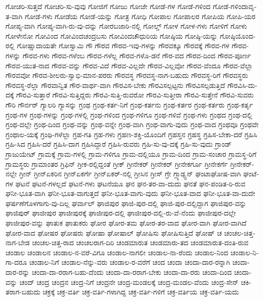 {ಗೋಚರಿ-ಸುತ್ತದೆ
ಗೋಚರಿ-ಸು-ವುವು
ಗೋಜಿಗೆ
ಗೋಜು
ಗೋಜೇ
ಗೋಡೆ-ಗಳ
ಗೋಡೆ-ಗಳಿಂದ
ಗೋಡೆ-ಗಳಿಂದಾವೃ-ತ-ವಾಗಿ
ಗೋಡೆ-ಗಳು
ಗೋಡೆಯ
ಗೋಡೆ-ಯನ್ನು
ಗೋತ್ರ
ಗೋಧಿ
ಗೋಪಾಲ
ಗೋಪಾಲರ
ಗೋಪಿಯ
ಗೋಪಿ-ಯರ
ಗೋಪ್ಯ-ವಾಗಿ
ಗೋಪ್ಯ-ವಾಗಿ-ರು-ವು-ದನ್ನು
ಗೋರಬಜಾರಿ-ನಲ್ಲಿ
ಗೋಲ್ಡ್
ಗೋಳ
ಗೋಳ-ಗಳು
ಗೋಳಿಗೆ
ಗೋಳು
ಗೋಳೇನೋ
ಗೋವಿಂದ
ಗೋವಿಂದಚಂದ್ರಬಸು
ಗೋವಿಂದಚೌಧುರಿಯ
ಗೋಷ್ಠಿಯ
ಗೋಷ್ಠಿ-ಯನ್ನು
ಗೋಷ್ಠಿಯೊಂದ-ರಲ್ಲಿ
ಗೋಷ್ಷಾದಾಯತೇ
ಗೋಸ್ವಾಮಿ
ಗೌ
ಗೌರವ
ಗೌರವ-ಇವು-ಗಳನ್ನು
ಗೌರವಕ್ಕೂ
ಗೌರವಕ್ಕೆ
ಗೌರವ-ಗಳ
ಗೌರವ-ಗಳನ್ನು
ಗೌರವ-ಗಳು
ಗೌರವ-ಗಳೆಂಬ
ಗೌರವ-ಗಳೆಲ್ಲ
ಗೌರವ-ಗಳೊ-ಡನೆ
ಗೌರ-ವದ
ಗೌರವ-ದಿಂದ
ಗೌರವ-ಪೂರ್ಣ
ಗೌರವ-ಯುತ-ನಾದ
ಗೌರವ-ವನ್ನು
ಗೌರವ-ವಿದೆ
ಗೌರವ-ವಿಲ್ಲದೇ
ಗೌರವ-ವಿಲ್ಲವೋ
ಗೌರವ-ವೆಂದೂ
ಗೌರವ-ವೆಲ್ಲಾ
ಗೌರವವೋ
ಗೌರವ-ಶೀಲರು-ಸ್ವಾಭಿ-ಮಾನ-ಪರರು
ಗೌರವಸ್ಥ
ಗೌರವಸ್ಥ-ನಾಗ-ಬಹುದು
ಗೌರವಸ್ಥ-ರಿಗೆ
ಗೌರವಸ್ಥರು
ಗೌರವಸ್ಥ-ರೆಲ್ಲಾ
ಗೌರವಾನ್ವಿತ
ಗೌರ-ವಾರ್ಥ-ವಾಗಿ
ಗೌರವಿಸ-ಬೇಕು
ಗೌರವಿಸಲ್ಪಟ್ಟನು
ಗೌರವಿಸಲ್ಪಡುತ್ತಿದೆ
ಗೌರವಿಸಿ-ದು-ದಕ್ಕೆ
ಗೌರವಿ-ಸುತ್ತಾರೆ
ಗೌರವಿ-ಸುತ್ತಿದ್ದರು
ಗೌರವಿ-ಸುತ್ತಿ-ರುವರೋ
ಗೌರವಿ-ಸುತ್ತೀರಾ
ಗೌರವಿ-ಸುತ್ತೇನೆ
ಗೌರವಿ-ಸುವರು
ಗೌರಿ
ಗೌರ್ನರ್
ಗ್ಯಾಲರಿ
ಗ್ಯಾಸನ್ನು
ಗ್ರಂಥ
ಗ್ರಂಥ-ಕರ್ತ-ನಿಗೆ
ಗ್ರಂಥ-ಕರ್ತನು
ಗ್ರಂಥ-ಕರ್ತರ
ಗ್ರಂಥ-ಕರ್ತರು
ಗ್ರಂಥ-ಕರ್ತೃ
ಗ್ರಂಥ-ಗಳ
ಗ್ರಂಥ-ಗಳನ್ನು
ಗ್ರಂಥ-ಗಳಲ್ಲಿ
ಗ್ರಂಥ-ಗಳಿಂದ
ಗ್ರಂಥ-ಗಳಿಗೂ
ಗ್ರಂಥ-ಗಳಿವೆ
ಗ್ರಂಥ-ಗಳು
ಗ್ರಂಥದ
ಗ್ರಂಥ-ದಲ್ಲಿ
ಗ್ರಂಥ-ದಲ್ಲೇ
ಗ್ರಂಥ-ದಿಂದ
ಗ್ರಂಥ-ವನ್ನು
ಗ್ರಂಥ-ವನ್ನೇ
ಗ್ರಂಥ-ವಾಗಿ
ಗ್ರಂಥ-ವಾಗು-ವುದು
ಗ್ರಂಥ-ವಾದ
ಗ್ರಂಥವೂ
ಗ್ರಂಥವೇ
ಗ್ರಂಥಾಲ-ಯಕ್ಕೆ
ಗ್ರಂಥಿ-ಗಳೆಲ್ಲಾ
ಗ್ರಹ-ಗತಿ
ಗ್ರಹ-ಗಳು
ಗ್ರಹಣ-ಶಕ್ತಿ-ಯೊಂದಿಗೆ
ಗ್ರಹಸ್ತನ
ಗ್ರಹಸ್ಥ
ಗ್ರಹಿಸ-ಬೇಕಾ-ದರೆ
ಗ್ರಹಿಸಿ
ಗ್ರಹಿ-ಸಿದ
ಗ್ರಹಿಸಿ-ದರೆ
ಗ್ರಹಿಸಿ-ದಾಗ
ಗ್ರಹಿಸಿದ್ದಾರೆ
ಗ್ರಹಿಸಿ-ರುವರು
ಗ್ರಹಿ-ಸು-ವು-ದಕ್ಕೆ
ಗ್ರಹಿ-ಸು-ವುದು
ಗ್ರಾಂಡ್
ಗ್ರಾಜುಯೇಟ್
ಗ್ರಾಮಕ್ಕೆ
ಗ್ರಾಮ-ಗಳಲ್ಲಿ
ಗ್ರಾಮ-ಗಳಿಗೂ
ಗ್ರಾಮ-ದಲ್ಲಿಯೂ
ಗ್ರಾಮ-ದಿಂದ
ಗ್ರಾಮ-ಸಂಚಾರ
ಗ್ರಾಮಸ್ಥ-ರಿಗೆ
ಗ್ರಾಮಸ್ಥರು
ಗ್ರಾಮಾಂತರ
ಗ್ರಿಫಿನ್
ಗ್ರೀಕ-ರಲ್ಲಿದ್ದಂತೆ
ಗ್ರೀಕ್
ಗ್ರೀನೇಕರ್
ಗ್ರೀನೇಕರ್
ಗ್ರೀನೇಕರ್ಗೂ
ಗ್ರೀನೇಕರ್ಗೆ
ಗ್ರೀನೇಕರ್-ನಲ್ಲೇ
ಗ್ರೀನ್
ಗ್ರೀನ್ಏಕರಿನ
ಗ್ರೀನ್ಏಕರ್ಗೆ
ಗ್ರೀನ್ಏಕರ್-ನಲ್ಲಿ
ಗ್ರೀಸಿನ
ಗ್ರೀಸ್
ಗ್ರೇ
ಗ್ಲ್ಯಾಡ್ಸ್ಟನ್
ಘಂಟಾಘೋಷ-ವಾಗಿ
ಘಂಟೆ-ಗಳ
ಘಟನೆ
ಘಟನೆ-ಗಳಲ್ಲದೆ
ಘಟನೆ-ಗಳು
ಘಟನೆಯೂ
ಘನ
ಘನ-ತರ-ವಾ-ದುದು
ಘನತೆ
ಘನ-ಪಂಡಿತ-ರಿ-ರುವ
ಘನೀ-ಭೂತ-ವಾಗಿ
ಘನೀ-ಭೂತ-ವಾಗುತ್ತದೆ
ಘನೀ-ಭೂತ-ವಾಗು-ವುದು
ಘನೀ-ಭೂತ-ವಾದ
ಘನೀ-ಭೂತ-ವಾ-ದುದೇ
ಘರ್ಷಣೆಗೊಳಗಾಗು-ವು-ದಿಲ್ಲ
ಘರ್ವಾಲ್
ಘಾಜಿಪುರ
ಘಾಜಿ-ಪುರ-ದಲ್ಲಿ
ಘಾಜಿ-ಪುರ-ದಲ್ಲಿದ್ದಾಗ
ಘಾಜಿಪುರ-ವನ್ನು
ಘಾಜಿಪುರ್
ಘಾಜೀಪುರ
ಘಾಜೀಪುರಕ್ಕೆ
ಘಾಜೀಪುರ-ದಲ್ಲಿ
ಘಾಜೀಪುರ-ದಲ್ಲಿ-ರು-ವೆ-ನೆಂದು
ಘಾಜೀಪುರ-ದಲ್ಲೇ
ಘಾಜೀಪುರ-ವನ್ನು
ಘಾತುಕ
ಘಾತುಕರು
ಘೋರ
ಘೋರ-ತಮ
ಘೋರ-ತರ-ವಾದ
ಘೋರ-ವಾಗಿ
ಘೋರ-ವಾಗಿದೆ
ಘೋರ-ವಾದ
ಘೋಷರ
ಘೋಷರು
ಘೋಷಾ
ಘೋಷಾಲ್
ಘೋಷಿಸು
ಘೋಷಿಸುತ್ತಿದೆ
ಘೋಷ್
ಚ
ಚಂಚಲ-ಚಿತ್ತ-ನಾಗ-ಬೇಡ
ಚಂಚಲ-ಚಿತ್ತ-ರಾದ
ಚಂಚಲರಾಗ-ದಿರಿ
ಚಂಡಮಾರುತ
ಚಂಡಮಾರು-ತದ
ಚಂಡಮಾರುತ-ದಂತಿ-ರುವ
ಚಂಡಾಲ
ಚಂಡಾಲನ
ಚಂಡಾಲ-ನ-ವರೆ-ವಿಗೂ
ಚಂಡಾಲ-ನಾಗಲೀ
ಚಂಡಾಲ-ನಾ-ರೆಂದು
ಚಂಡಾಲ-ನಿಂದ
ಚಂಡಾಲ-ನಿ-ಗಾ-ದರೂ
ಚಂಡಾಲ-ನಿಗೆ
ಚಂಡಾಲ-ನೆನ್ನು-ವರು
ಚಂಡಾಲ-ರ-ವರೆಗೆ
ಚಂದ
ಚಂದಾ
ಚಂದಾ-ದಾರ-ರನ್ನಾಗಿ
ಚಂದಾ-ದಾರ-ರನ್ನು
ಚಂದಾ-ದಾ-ರರಾಗ-ಬಹು-ದೆಂದು
ಚಂದಾ-ದಾ-ರರಾಗ-ಬೇಕು
ಚಂದಾ-ದಾ-ರರು
ಚಂದಾ-ದಿಂದ
ಚಂದಾ-ವನ್ನು
ಚಂದ್
ಚಂದ್ರ
ಚಂದ್ರನ
ಚಂದ್ರ-ನಿಗೆ
ಚಂದ್ರನೇ
ಚಂದ್ರ-ಮಂಡಲಕ್ಕೆ
ಚಂದ್ರ-ಮಂಡಲ-ವೆಂದು
ಚಂದ್ರ-ಸೇನ್
ಚಕಿ-ತರಾಗ-ಬಹುದು
ಚಕ್ರಕ್ಕೆ
ಚಕ್ರ-ವರ್ತಿ
ಚಕ್ರ-ವರ್ತಿ-ಗಳಾಗಿದ್ದ
ಚಕ್ರ-ವರ್ತಿ-ಗಳಿಗೆ
ಚಕ್ರ-ವರ್ತಿಯ
ಚಕ್ರ-ವರ್ತಿ-ಯದು
}
